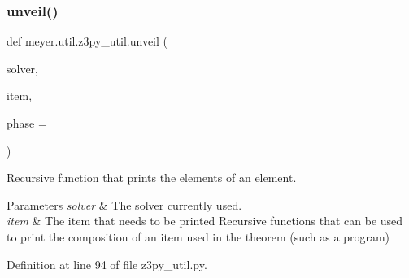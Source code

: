 \subsubsection{\texorpdfstring{unveil()}{unveil()}}
{\footnotesize\ttfamily def meyer.\+util.\+z3py\+\_\+util.\+unveil (\begin{DoxyParamCaption}\item[{}]{solver,  }\item[{}]{item,  }\item[{}]{phase = {} }\end{DoxyParamCaption})}



Recursive function that prints the elements of an element. 


\begin{DoxyParams}{Parameters}
{\em solver} & The solver currently used. \\
\hline
{\em item} & The item that needs to be printed Recursive functions that can be used to print the composition of an item used in the theorem (such as a program) \\
\hline
\end{DoxyParams}


Definition at line 94 of file z3py\+\_\+util.\+py.

